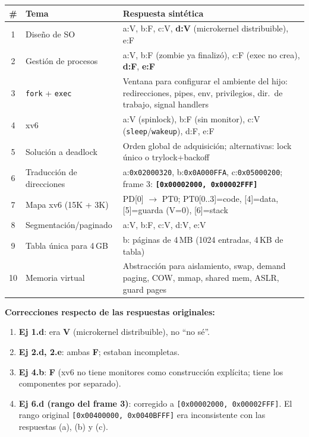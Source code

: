 \documentclass[11pt,a4paper]{article}
\begin{document}
\begin{center}
\footnotesize
\begin{tabular}{@{}clp{9cm}@{}}
\toprule
\# & Tema & Respuesta sintética \\
\midrule
1  & Diseño de SO        & a:V, b:F, c:V, \textbf{d:V} (microkernel distribuible), e:F \\
2  & Gestión de procesos & a:V, b:F (zombie ya finalizó), c:F (exec no crea), \textbf{d:F}, \textbf{e:F} \\
3  & \texttt{fork} + \texttt{exec} & Ventana para configurar el ambiente del hijo: redirecciones, pipes, env, privilegios, dir.\ de trabajo, signal handlers \\
4  & xv6                 & a:V (spinlock), b:F (sin monitor), c:V (\texttt{sleep}/\texttt{wakeup}), d:F, e:F \\
5  & Solución a deadlock & Orden global de adquisición; alternativas: lock único o trylock+backoff \\
6  & Traducción de direcciones & a:\texttt{0x02000320}, b:\texttt{0x0A000FFA}, c:\texttt{0x05000200}; frame 3: \textbf{\texttt{[0x00002000, 0x00002FFF]}} \\
7  & Mapa xv6 (15K + 3K) & PD[0] $\to$ PT0; PT0[0..3]=code, [4]=data, [5]=guarda (V=0), [6]=stack \\
8  & Segmentación/paginado & a:V, b:F, c:V, d:V, e:V \\
9  & Tabla única para 4\,GB & b: páginas de 4\,MB (1024 entradas, 4\,KB de tabla) \\
10 & Memoria virtual     & Abstracción para aislamiento, swap, demand paging, COW, mmap, shared mem, ASLR, guard pages \\
\bottomrule
\end{tabular}
\end{center}

\begin{importante}
\textbf{Correcciones respecto de las respuestas originales:}

\begin{enumerate}[leftmargin=*,nosep]
    \item \textbf{Ej 1.d}: era \textbf{V} (microkernel distribuible),
        no ``no sé''.
    \item \textbf{Ej 2.d, 2.e}: ambas \textbf{F}; estaban
        incompletas.
    \item \textbf{Ej 4.b}: \textbf{F} (xv6 no tiene monitores como
        construcción explícita; tiene los componentes por separado).
    \item \textbf{Ej 6.d (rango del frame 3)}: corregido a
        \texttt{[0x00002000, 0x00002FFF]}. El rango original
        \texttt{[0x00400000, 0x0040BFFF]} era inconsistente con las
        respuestas (a), (b) y (c).
\end{enumerate}
\end{importante}
\end{document}

